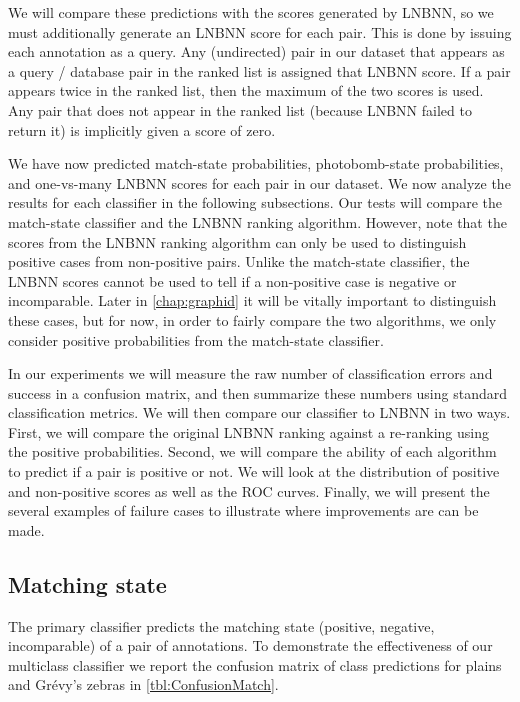     We will compare these predictions with the scores generated by LNBNN, so we must additionally generate an
      LNBNN score for each pair.
    This is done by issuing each annotation as a query.
    Any (undirected) pair in our dataset that appears as a query / database pair in the ranked list is assigned
      that LNBNN score.
    If a pair appears twice in the ranked list, then the maximum of the two scores is used.
    Any pair that does not appear in the ranked list (because LNBNN failed to return it) is implicitly given a
      score of zero.

    We have now predicted match-state probabilities, photobomb-state probabilities, and one-vs-many LNBNN scores
      for each pair in our dataset.
    We now analyze the results for each classifier in the following subsections.
    Our tests will compare the match-state classifier and the LNBNN ranking algorithm.
    However, note that the scores from the LNBNN ranking algorithm can only be used to distinguish positive cases
      from non-positive pairs.
    Unlike the match-state classifier, the LNBNN scores cannot be used to tell if a non-positive case is negative
      or incomparable.
    Later in \cref{chap:graphid} it will be vitally important to distinguish these cases, but for now, in order
      to fairly compare the two algorithms, we only consider positive probabilities from the match-state
      classifier.

    In our experiments we will measure the raw number of classification errors and success in a confusion matrix,
      and then summarize these numbers using standard classification metrics.
    We will then compare our classifier to LNBNN in two ways.
    First, we will compare the original LNBNN ranking against a re-ranking using the positive probabilities.
    Second, we will compare the ability of each algorithm to predict if a pair is positive or not.
    We will look at the distribution of positive and non-positive scores as well as the ROC curves.
    Finally, we will present the several examples of failure cases to illustrate where improvements are can be
      made.

    \FloatBarrier{}
    \subsection{Matching state}

        The primary classifier predicts the matching state (positive, negative, incomparable) of a pair of
        annotations. To demonstrate the effectiveness of our multiclass classifier we report the confusion matrix
        of class predictions for plains and Grévy's zebras in \cref{tbl:ConfusionMatch}.


